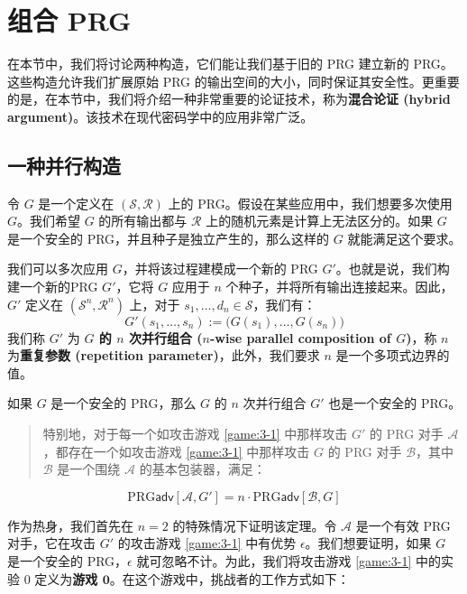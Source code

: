 \section{组合 PRG}\label{sec:3-4}

在本节中，我们将讨论两种构造，它们能让我们基于旧的 PRG 建立新的 PRG。这些构造允许我们扩展原始 PRG 的输出空间的大小，同时保证其安全性。更重要的是，在本节中，我们将介绍一种非常重要的论证技术，称为\textbf{混合论证 (hybrid argument)}。该技术在现代密码学中的应用非常广泛。

\subsection{一种并行构造}\label{subsec:3-4-1}

令 $G$ 是一个定义在 $(\mathcal S,\mathcal R)$ 上的 PRG。假设在某些应用中，我们想要多次使用 $G$。我们希望 $G$ 的所有输出都与 $\mathcal{R}$ 上的随机元素是计算上无法区分的。如果 $G$ 是一个安全的 PRG，并且种子是独立产生的，那么这样的 $G$ 就能满足这个要求。

我们可以多次应用 $G$，并将该过程建模成一个新的 PRG $G'$。也就是说，我们构建一个新的PRG $G'$，它将 $G$ 应用于 $n$ 个种子，并将所有输出连接起来。因此，$G'$ 定义在 $(\mathcal S^n,\mathcal R^n)$ 上，对于 $s_1,\dots,d_n\in\mathcal S$，我们有：
\[
G'(s_1,\dots,s_n):=\big(G(s_1),\dots,G(s_n)\big)
\]
我们称 $G'$ 为 \textbf{$G$ 的 $n$ 次并行组合 ($n$-wise parallel composition of $G$)}，称 $n$ 为\textbf{重复参数 (repetition parameter)}，此外，我们要求 $n$ 是一个多项式边界的值。

\begin{theorem}\label{theo:3-2}
如果 $G$ 是一个安全的 PRG，那么 $G$ 的 $n$ 次并行组合 $G'$ 也是一个安全的 PRG。
\begin{quote}
特别地，对于每一个如攻击游戏 \ref{game:3-1} 中那样攻击 $G'$ 的 PRG 对手 $\mathcal A$，都存在一个如攻击游戏 \ref{game:3-1} 中那样攻击 $G$ 的 PRG 对手 $\mathcal B$，其中 $\mathcal B$ 是一个围绕 $\mathcal A$ 的基本包装器，满足：
\end{quote}
\[
\mathrm{PRG}\mathsf{adv}[\mathcal{A},G']
=n\cdot
\mathrm{PRG}\mathsf{adv}[\mathcal{B},G]
\]
\end{theorem}

作为热身，我们首先在 $n=2$ 的特殊情况下证明该定理。令 $\mathcal A$ 是一个有效 PRG 对手，它在攻击 $G'$ 的攻击游戏 \ref{game:3-1} 中有优势 $\epsilon$。我们想要证明，如果 $G$ 是一个安全的 PRG，$\epsilon$ 就可忽略不计。为此，我们将攻击游戏 \ref{game:3-1} 中的实验 $0$ 定义为\textbf{游戏 $\mathbf{0}$}。在这个游戏中，挑战者的工作方式如下：

